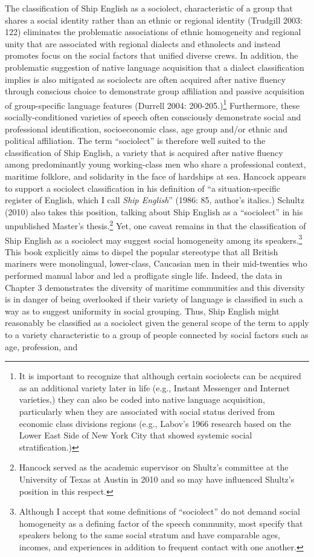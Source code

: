 \documentclass[12pt]{article}
\newenvironment{styleStandard}{\renewcommand\baselinestretch{1.0}\setlength\leftskip{0cm}\setlength\rightskip{0cm plus 1fil}\setlength\parindent{0cm}\setlength\parfillskip{0pt plus 1fil}\setlength\parskip{0in plus 1pt}\writerlistparindent\writerlistleftskip\leavevmode\normalfont\normalsize\writerlistlabel\ignorespaces}{\unskip\vspace{0in plus 1pt}\par}
\newcommand\writerlistleftskip{}
\newcommand\writerlistparindent{}
\newcommand\writerlistlabel{}
\begin{document}
\begin{styleStandard}
The classification of Ship English as a sociolect, characteristic of a group that shares a social identity rather than an ethnic or regional identity (Trudgill 2003: 122) eliminates the problematic associations of ethnic homogeneity and regional unity that are associated with regional dialects and ethnolects and instead promotes focus on the social factors that unified diverse crews. In addition, the problematic suggestion of native language acquisition that a dialect classification implies is also mitigated as sociolects are often acquired after native fluency through conscious choice to demonstrate group affiliation and passive acquisition of group-specific language features (Durrell 2004: 200-205.)\footnote{ It is important to recognize that although certain sociolects can be acquired as an additional variety later in life (e.g., Instant Messenger and Internet varieties,) they can also be coded into native language acquisition, particularly when they are associated with social status derived from economic class divisions regions (e.g., Labov’s 1966 research based on the Lower East Side of New York City that showed systemic social stratification.) } Furthermore, these socially-conditioned varieties of speech often consciously demonstrate social and professional identification, socioeconomic class, age group and/or ethnic and political affiliation. The term “sociolect” is therefore well suited to the classification of Ship English, a variety that is acquired after native fluency among predominantly young working-class men who share a professional context, maritime folklore, and solidarity in the face of hardships at sea. Hancock appears to support a sociolect classification in his definition of “a situation-specific register of English, which I call \textit{Ship English}” (1986: 85, author’s italics.) Schultz (2010) also takes this position, talking about Ship English as a “sociolect” in his unpublished Master’s thesis.\footnote{ Hancock served as the academic supervisor on Shultz’s committee at the University of Texas at Austin in 2010 and so may have influenced Shultz’s position in this respect. } Yet, one caveat remains in that the classification of Ship English as a sociolect may suggest social homogeneity among its speakers.\footnote{ Although I accept that some definitions of “sociolect” do not demand social homogeneity as a defining factor of the speech community, most specify that speakers belong to the same social stratum and have comparable ages, incomes, and experiences in addition to frequent contact with one another. } This book explicitly aims to dispel the popular stereotype that all British mariners were monolingual, lower-class, Caucasian men in their mid-twenties who performed manual labor and led a profligate single life. Indeed, the data in Chapter 3 demonstrates the diversity of maritime communities and this diversity is in danger of being overlooked if their variety of language is classified in such a way as to suggest uniformity in social grouping. Thus, Ship English might reasonably be classified as a sociolect given the general scope of the term to apply to a variety characteristic to a group of people connected by social factors such as age, profession, and 
\end{styleStandard}
\end{document}
